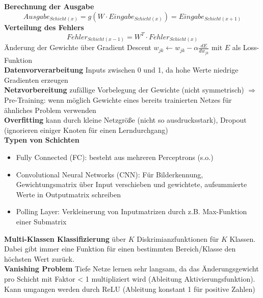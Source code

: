 \documentclass[12pt]{article}
\begin{document}
	\textbf{Berechnung der Ausgabe}
	$$Ausgabe_{Schicht(x)} = g(W \cdot Eingabe_{Schicht(x)}) = Eingabe_{Schicht(x+1)}$$
	\textbf{Verteilung des Fehlers}
	$$Fehler_{Schicht(x-1)} = W^T \cdot Fehler_{Schicht(x)}$$
	Änderung der Gewichte über Gradient Descent $w_{jk} \leftarrow w_{jk} - \alpha \frac{dE}{dw_{jk}}$ mit $E$ als Loss-Funktion\\
	\textbf{Datenvorverarbeitung} Inputs zwischen 0 und 1, da hohe Werte niedrige Gradienten erzeugen\\
	\textbf{Netzvorbereitung} zufällige Vorbelegung der Gewichte (nicht symmetrisch) $\Rightarrow$ Pre-Training: wenn möglich Gewichte eines bereits trainierten Netzes für ähnliches Problem verwenden\\
	\textbf{Overfitting} kann durch kleine Netzgröße (nicht so ausdrucksstark), Dropout (ignorieren einiger Knoten für einen Lerndurchgang)\\
	\textbf{Typen von Schichten}
	\begin{itemize}
		\item Fully Connected (FC): besteht aus mehreren Perceptrons (s.o.)
		\item Convolutional Neural Networks (CNN): Für Bilderkennung, Gewichtungsmatrix über Input verschieben und gewichtete, aufsummierte Werte in Outputmatrix schreiben
		\item Polling Layer: Verkleinerung von Inputmatrizen durch z.B. Max-Funktion einer Submatrix
	\end{itemize}
	\textbf{Multi-Klassen Klassifizierung} über $K$ Diskrimianzfunktionen für $K$ Klassen. Dabei gibt immer eine Funktion für einen bestimmten Bereich/Klasse den höchsten Wert zurück.\\
	\textbf{Vanishing Problem} Tiefe Netze lernen sehr langsam, da das Änderungsgewicht pro Schicht mit Faktor < 1 multipliziert wird (Ableitung Aktivierungsfunktion). Kann umgangen werden durch ReLU (Ableitung konstant 1 für positive Zahlen)
	
	
\end{document}
